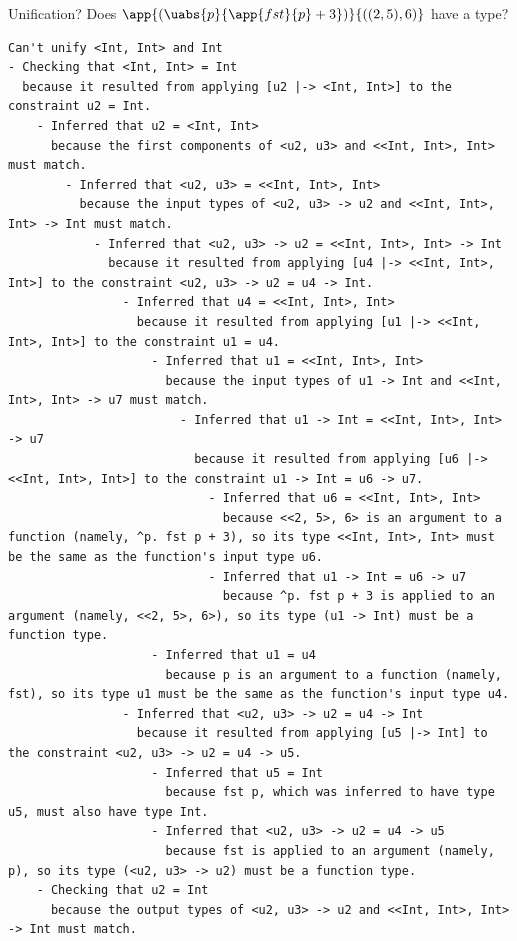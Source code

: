 \documentclass[xcolor=svgnames,12pt,aspectratio=169]{beamer}
\newenvironment{xframe}[1][]
  {\begin{frame}[fragile,environment=xframe,#1]}
  {\end{frame}}
\begin{document}
\begin{xframe}{Unification?}
\small Does $\app{(\uabs{p}{\app{fst}{p} + 3})}{((2,5), 6)}$ have a
type?

\begin{Verbatim}[fontsize=\TINY]
Can't unify <Int, Int> and Int
- Checking that <Int, Int> = Int
  because it resulted from applying [u2 |-> <Int, Int>] to the constraint u2 = Int.
    - Inferred that u2 = <Int, Int>
      because the first components of <u2, u3> and <<Int, Int>, Int> must match.
        - Inferred that <u2, u3> = <<Int, Int>, Int>
          because the input types of <u2, u3> -> u2 and <<Int, Int>, Int> -> Int must match.
            - Inferred that <u2, u3> -> u2 = <<Int, Int>, Int> -> Int
              because it resulted from applying [u4 |-> <<Int, Int>, Int>] to the constraint <u2, u3> -> u2 = u4 -> Int.
                - Inferred that u4 = <<Int, Int>, Int>
                  because it resulted from applying [u1 |-> <<Int, Int>, Int>] to the constraint u1 = u4.
                    - Inferred that u1 = <<Int, Int>, Int>
                      because the input types of u1 -> Int and <<Int, Int>, Int> -> u7 must match.
                        - Inferred that u1 -> Int = <<Int, Int>, Int> -> u7
                          because it resulted from applying [u6 |-> <<Int, Int>, Int>] to the constraint u1 -> Int = u6 -> u7.
                            - Inferred that u6 = <<Int, Int>, Int>
                              because <<2, 5>, 6> is an argument to a function (namely, ^p. fst p + 3), so its type <<Int, Int>, Int> must be the same as the function's input type u6.
                            - Inferred that u1 -> Int = u6 -> u7
                              because ^p. fst p + 3 is applied to an argument (namely, <<2, 5>, 6>), so its type (u1 -> Int) must be a function type.
                    - Inferred that u1 = u4
                      because p is an argument to a function (namely, fst), so its type u1 must be the same as the function's input type u4.
                - Inferred that <u2, u3> -> u2 = u4 -> Int
                  because it resulted from applying [u5 |-> Int] to the constraint <u2, u3> -> u2 = u4 -> u5.
                    - Inferred that u5 = Int
                      because fst p, which was inferred to have type u5, must also have type Int.
                    - Inferred that <u2, u3> -> u2 = u4 -> u5
                      because fst is applied to an argument (namely, p), so its type (<u2, u3> -> u2) must be a function type.
    - Checking that u2 = Int
      because the output types of <u2, u3> -> u2 and <<Int, Int>, Int> -> Int must match.

\end{Verbatim}
\end{xframe}
\end{document}
